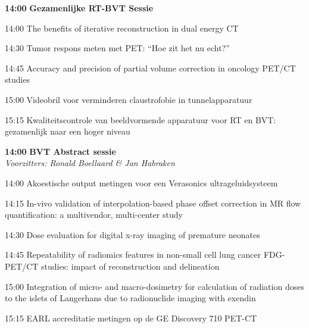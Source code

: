 \documentclass[a4paper,10pt]{report}
\begin{document}
\begin{multicols*}{3}
\begin{packed_enum}
\item[\textbf{14:00}] \textbf{Gezamenlijke RT-BVT Sessie}
\item[14:00] The benefits of iterative reconstruction in dual energy CT
\item[14:30] Tumor respons meten met PET: “Hoe zit het nu echt?”
\item[14:45] Accuracy and precision of partial volume cor\-rection in oncology PET/CT studies
\item[15:00] Videobril voor verminderen claustrofobie in tun\-nel\-ap\-pa\-ra\-tuur
\item[15:15] Kwaliteitscontrole van beeldvormende apparatuur voor RT en BVT: gezamenlijk naar een hoger niveau
\end{packed_enum} %

\vfill 

\begin{packed_enum}
\item[\textbf{14:00}]\textbf{BVT Abstract sessie}\\\textit{Voorzitters: Ronald Boellaard \& Jan Habraken}
\item[14:00] Akoestische output metingen voor een Verasonics ultrageluidsysteem
\item[14:15] In-vivo validation of interpolation-based phase offset cor\-rection in MR flow quantification: a multivendor, multi-center study
\item[14:30] Dose eval\-uation for digital x-ray imaging of premature neonates
\item[14:45] Repeatability of radiomics features in non-small cell lung cancer FDG-PET/CT studies: impact of reconstruction and delineation
\item[15:00] Integration of micro- and macro-dosimetry for calculation of radiation doses to the islets of Langerhans due to radionuclide imaging with exendin
\item[15:15] EARL accreditatie metingen op de GE Discovery 710 PET-CT
\end{packed_enum} %
 

\end{multicols*}
\end{document}
